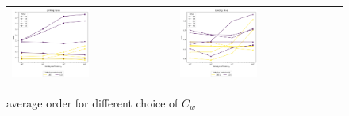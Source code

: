 \begin{figure}[h!]
    \centering
    \begin{tabular}{p{} p{}}
        \vspace{0pt} 
        \includegraphics[width=0.49\textwidth]{../figs/parametric/burgers_1D/orders_unlimited}
        &
        \vspace{0pt} 
        \includegraphics[width=0.49\textwidth]{../figs/parametric/burgers_1D/orders_limited}
    \end{tabular}
    \caption{ average order for different choice of $C_w$}
    \label{fig:burgess_sol}
\end{figure}



